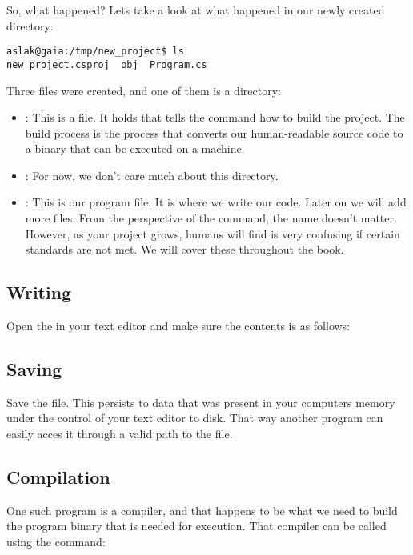 So, what happened? Lets take a look at what happened in our newly created directory:

\begin{verbatim}
aslak@gaia:/tmp/new_project$ ls
new_project.csproj  obj  Program.cs
\end{verbatim}

Three files were created, and one of them is a directory:
\begin{itemize}
  \item {}: This is a  file. It holds  that tells the  command how to build the project. The build process is the process that converts our human-readable source code to a binary that can be executed on a machine.
  \item {}: For now, we don't care much about this directory.
  \item {}: This is our program file. It is where we write our code. Later on we will add more files. From the perspective of the  command, the name doesn't matter. However, as your project grows, humans will find is very confusing if certain standards are not met. We will cover these throughout the book.
\end{itemize}

\subsection{Writing}
\label{first:writing}

Open the  in your text editor and make sure the contents is as follows:


\subsection{Saving}

Save the file. This persists to data that was present in your computers memory under the control of your text editor to disk. That way another program can easily acces it through a valid path to the file.

\subsection{Compilation}

One such program is a compiler, and that happens to be what we need to build the program binary that is needed for execution. That compiler can be called using the  command:

